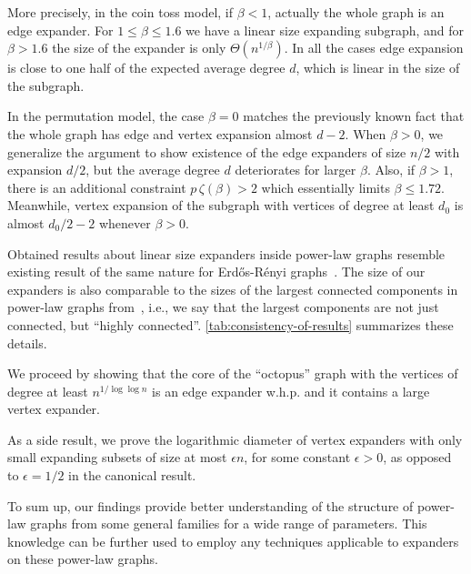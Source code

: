 More precisely, in the coin toss model, if $\beta<1$, actually the whole graph is an edge expander.
For $1\leq\beta\leq 1.6$ we have a linear size expanding subgraph,
and for $\beta>1.6$ the size of the expander is only $\Theta(n^{1/\beta})$.
In all the cases edge expansion is close to one half of the expected average degree $d$,
which is linear in the size of the subgraph.

In the permutation model, the case $\beta=0$ matches the previously known fact
that the whole graph has edge and vertex expansion almost $d-2$.
When $\beta>0$, we generalize the argument to show existence
of the edge expanders of size $n/2$ with expansion $d/2$,
but the average degree $d$ deteriorates for larger $\beta$.
Also, if $\beta>1$, there is an additional constraint $p\,\zeta(\beta)>2$
which essentially limits $\beta\leq 1.72$.
Meanwhile, vertex expansion of the subgraph with vertices of degree
at least $d_0$ is almost $d_0/2-2$ whenever $\beta>0$.

Obtained results about linear size expanders inside power-law graphs
resemble existing result of the same nature for Erd\H{o}s-R\'enyi graphs~\cite{kri17}.
The size of our expanders is also comparable to the sizes of
the largest connected components in power-law graphs from~\cite{acl01}, i.e.,
we say that the largest components are not just connected, but ``highly connected''.
\autoref{tab:consistency-of-results} summarizes these details.

We proceed by showing that the core of the ``octopus'' graph with the vertices
of degree at least $n^{1/\log\log n}$ is an edge expander w.h.p.
and it contains a large vertex expander.

As a side result, we prove the logarithmic diameter of vertex expanders
with only small expanding subsets of size at most $\epsilon n$, for some
constant $\epsilon>0$, as opposed to $\epsilon=1/2$ in the canonical result.

To sum up, our findings provide better understanding of the structure
of power-law graphs from some general families for a wide range of parameters.
This knowledge can be further used to employ any techniques
applicable to expanders on these power-law graphs.

